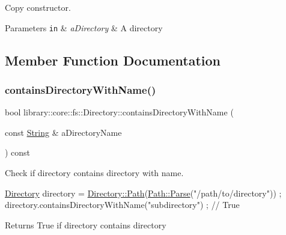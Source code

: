 Copy constructor. 


\begin{DoxyParams}[1]{Parameters}
\mbox{\tt in}  & {\em a\+Directory} & A directory \\
\hline
\end{DoxyParams}


\subsection{Member Function Documentation}
\mbox{\label{classlibrary_1_1core_1_1fs_1_1_directory_a8e669f2db69416126d2f7076bdf31e33}} 
\subsubsection{\texorpdfstring{contains\+Directory\+With\+Name()}{containsDirectoryWithName()}}
{\footnotesize\ttfamily bool library\+::core\+::fs\+::\+Directory\+::contains\+Directory\+With\+Name (\begin{DoxyParamCaption}\item[{const \hyperlink{classlibrary_1_1core_1_1types_1_1_string}{String} \&}]{a\+Directory\+Name }\end{DoxyParamCaption}) const}



Check if directory contains directory with name. 


\begin{DoxyCode}
\hyperlink{classlibrary_1_1core_1_1fs_1_1_directory_a3ec39f6cad19a81d520e9a1f2d8bb1f7}{Directory} directory = \hyperlink{classlibrary_1_1core_1_1fs_1_1_directory_ae906e33e4659219cf296dd314c7726b8}{Directory::Path}(\hyperlink{classlibrary_1_1core_1_1fs_1_1_path_a6ba644b6609507e724c217bf2020f5ae}{Path::Parse}(\textcolor{stringliteral}{"/path/to/directory"}))
       ;
directory.containsDirectoryWithName(\textcolor{stringliteral}{"subdirectory"}) ; \textcolor{comment}{// True}
\end{DoxyCode}


\begin{DoxyReturn}{Returns}
True if directory contains directory 
\end{DoxyReturn}
\mbox{\label{classlibrary_1_1core_1_1fs_1_1_directory_aa4e066fe1523c866fd1e7b7b82ad66f5}} 
